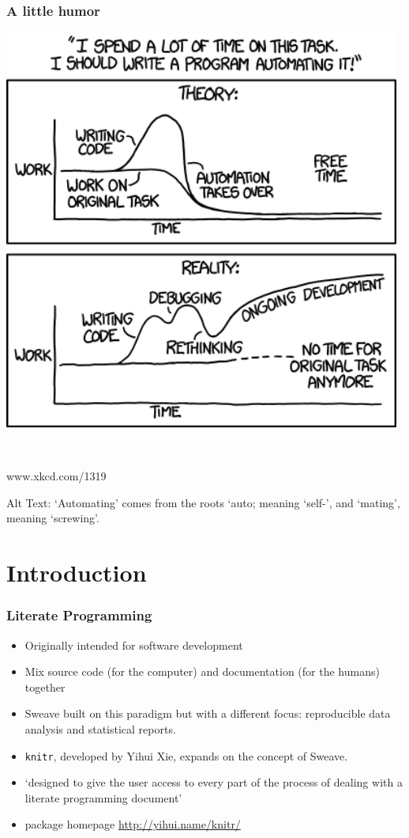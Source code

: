 \documentclass[t]{beamer}\usepackage[]{graphicx}\usepackage[]{color}
\begin{document}
\begin{frame}
  \frametitle{A little humor}
  \begin{minipage}[m]{0.58\textwidth}
    \includegraphics[width=0.98\textwidth]{figure/automation.png}
  \end{minipage}
  ~
  \begin{minipage}[m]{0.38\textwidth}
      
      \begin{center}
        www.xkcd.com/1319
      \end{center}

      Alt Text: `Automating' comes from the roots `auto; meaning `self-', and
      `mating', meaning `screwing'.
  \end{minipage} 
\end{frame}

\section{Introduction}
\begin{frame}[fragile] 
  \frametitle{Literate Programming}
  \begin{itemize}
    \item Originally intended for software development
    \item Mix source code (for the computer) and documentation (for the humans)
      together
    \item Sweave built on this paradigm but with a different focus:
      reproducible data analysis and statistical reports.
    \item {\tt knitr}, developed by Yihui Xie, expands on the concept of Sweave.
    \item `designed to give the user access to every part of the process of
      dealing with a literate programming document'
    \item package homepage \url{http://yihui.name/knitr/}
  \end{itemize}
\end{frame}
\end{document}
